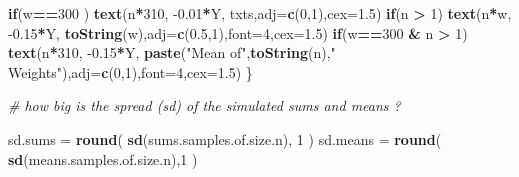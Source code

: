 \documentclass[
]{article}
\newenvironment{Shaded}{\begin{snugshade}}{\end{snugshade}}
\newcommand{\CommentTok}[1]{\textcolor[rgb]{0.56,0.35,0.01}{\textit{#1}}}
\newcommand{\ControlFlowTok}[1]{\textcolor[rgb]{0.13,0.29,0.53}{\textbf{#1}}}
\newcommand{\DataTypeTok}[1]{\textcolor[rgb]{0.13,0.29,0.53}{#1}}
\newcommand{\DecValTok}[1]{\textcolor[rgb]{0.00,0.00,0.81}{#1}}
\newcommand{\FloatTok}[1]{\textcolor[rgb]{0.00,0.00,0.81}{#1}}
\newcommand{\KeywordTok}[1]{\textcolor[rgb]{0.13,0.29,0.53}{\textbf{#1}}}
\newcommand{\NormalTok}[1]{#1}
\newcommand{\OperatorTok}[1]{\textcolor[rgb]{0.81,0.36,0.00}{\textbf{#1}}}
\newcommand{\StringTok}[1]{\textcolor[rgb]{0.31,0.60,0.02}{#1}}
\begin{document}
\begin{Shaded}
\begin{Highlighting}[]
     \ControlFlowTok{if}\NormalTok{(w}\OperatorTok{==}\DecValTok{300}\NormalTok{ ) }\KeywordTok{text}\NormalTok{(n}\OperatorTok{*}\DecValTok{310}\NormalTok{, }\FloatTok{-0.01}\OperatorTok{*}\NormalTok{Y,}
\NormalTok{          txts,}\DataTypeTok{adj=}\KeywordTok{c}\NormalTok{(}\DecValTok{0}\NormalTok{,}\DecValTok{1}\NormalTok{),}\DataTypeTok{cex=}\FloatTok{1.5}\NormalTok{)}
     \ControlFlowTok{if}\NormalTok{(n }\OperatorTok{>}\StringTok{ }\DecValTok{1}\NormalTok{) }\KeywordTok{text}\NormalTok{(n}\OperatorTok{*}\NormalTok{w, }\FloatTok{-0.15}\OperatorTok{*}\NormalTok{Y, }\KeywordTok{toString}\NormalTok{(w),}\DataTypeTok{adj=}\KeywordTok{c}\NormalTok{(}\FloatTok{0.5}\NormalTok{,}\DecValTok{1}\NormalTok{),}\DataTypeTok{font=}\DecValTok{4}\NormalTok{,}\DataTypeTok{cex=}\FloatTok{1.5}\NormalTok{)}
     \ControlFlowTok{if}\NormalTok{(w}\OperatorTok{==}\DecValTok{300} \OperatorTok{&}\StringTok{ }\NormalTok{n }\OperatorTok{>}\StringTok{ }\DecValTok{1}\NormalTok{) }\KeywordTok{text}\NormalTok{(n}\OperatorTok{*}\DecValTok{310}\NormalTok{, }\FloatTok{-0.15}\OperatorTok{*}\NormalTok{Y,}
          \KeywordTok{paste}\NormalTok{(}\StringTok{"Mean of"}\NormalTok{,}\KeywordTok{toString}\NormalTok{(n),}\StringTok{" Weights"}\NormalTok{),}\DataTypeTok{adj=}\KeywordTok{c}\NormalTok{(}\DecValTok{0}\NormalTok{,}\DecValTok{1}\NormalTok{),}\DataTypeTok{font=}\DecValTok{4}\NormalTok{,}\DataTypeTok{cex=}\FloatTok{1.5}\NormalTok{)}
\NormalTok{   \}}
   
   \CommentTok{# how big is the spread (sd) of the simulated sums and means ?}
   
\NormalTok{   sd.sums  =}\StringTok{ }\KeywordTok{round}\NormalTok{( }\KeywordTok{sd}\NormalTok{(sums.samples.of.size.n), }\DecValTok{1}\NormalTok{ )}
\NormalTok{   sd.means =}\StringTok{ }\KeywordTok{round}\NormalTok{( }\KeywordTok{sd}\NormalTok{(means.samples.of.size.n),}\DecValTok{1}\NormalTok{ )}
   

\end{Highlighting}
\end{Shaded}
\end{document}
